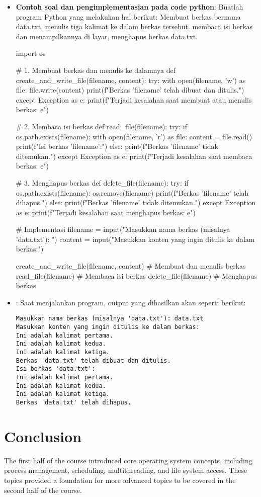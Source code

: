 \documentclass[12pt]{article}
\begin{document}
\begin{itemize}
    \item \textbf{Contoh soal dan pengimplementasian pada code python}:
    Buatlah program Python yang melakukan hal berikut:
    Membuat berkas bernama data.txt, menulis tiga kalimat ke dalam berkas tersebut. membaca isi berkas dan menampilkannya di layar, menghapus berkas data.txt.

    
    \begin{python}
import os

# 1. Membuat berkas dan menulis ke dalamnya
def create_and_write_file(filename, content):
    try:
        with open(filename, 'w') as file:
            file.write(content)
        print(f"Berkas '{filename}' telah dibuat dan ditulis.")
    except Exception as e:
        print(f"Terjadi kesalahan saat membuat atau menulis berkas: {e}")

# 2. Membaca isi berkas
def read_file(filename):
    try:
        if os.path.exists(filename):
            with open(filename, 'r') as file:
                content = file.read()
                print(f"Isi berkas '{filename}':")
        else:
            print(f"Berkas '{filename}' tidak ditemukan.")
    except Exception as e:
        print(f"Terjadi kesalahan saat membaca berkas: {e}")

# 3. Menghapus berkas
def delete_file(filename):
    try:
        if os.path.exists(filename):
            os.remove(filename)
            print(f"Berkas '{filename}' telah dihapus.")
        else:
            print(f"Berkas '{filename}' tidak ditemukan.")
    except Exception as e:
        print(f"Terjadi kesalahan saat menghapus berkas: {e}")

# Implementasi
filename = input("Masukkan nama berkas (misalnya 'data.txt'): ")
content = input("Masukkan konten yang ingin ditulis ke dalam berkas:\n")

create_and_write_file(filename, content)  # Membuat dan menulis berkas
read_file(filename)                        # Membaca isi berkas
delete_file(filename)                      # Menghapus berkas

    \end{python}
    \item {}: Saat menjalankan program, output yang dihasilkan akan seperti berikut:
\begin{verbatim}
Masukkan nama berkas (misalnya 'data.txt'): data.txt
Masukkan konten yang ingin ditulis ke dalam berkas:
Ini adalah kalimat pertama.
Ini adalah kalimat kedua.
Ini adalah kalimat ketiga.
Berkas 'data.txt' telah dibuat dan ditulis.
Isi berkas 'data.txt':
Ini adalah kalimat pertama.
Ini adalah kalimat kedua.
Ini adalah kalimat ketiga.
Berkas 'data.txt' telah dihapus.
\end{verbatim}
\end{itemize}

\section{Conclusion}
The first half of the course introduced core operating system concepts, including process management, scheduling, multithreading, and file system access. These topics provided a foundation for more advanced topics to be covered in the second half of the course.
\end{document}
